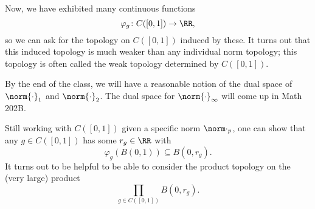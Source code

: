 \documentclass[../notes.tex]{subfiles}
\begin{document}
\begin{remark}
	Now, we have exhibited many continuous functions
	\[\varphi_g\colon C([0,1])\to\RR,\]
	so we can ask for the topology on $C([0,1])$ induced by these. It turns out that this induced topology is much weaker than any individual norm topology; this topology is often called the weak topology determined by $C([0,1])$.
\end{remark}
\begin{remark}
	By the end of the class, we will have a reasonable notion of the dual space of $\norm{\cdot}_1$ and $\norm{\cdot}_2$. The dual space for $\norm{\cdot}_\infty$ will come up in Math 202B.
\end{remark}
\begin{remark}
	Still working with $C([0,1])$ given a specific norm $\norm\cdot_p$, one can show that any $g\in C([0,1])$ has some $r_g\in\RR$ with
	\[\varphi_g(B(0,1))\subseteq B(0,r_g).\]
	It turns out to be helpful to be able to consider the product topology on the (very large) product
	\[\prod_{g\in C([0,1])}B(0,r_g).\]
\end{remark}
\end{document}
